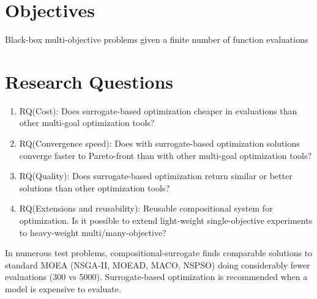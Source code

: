 \section{Objectives}
    Black-box multi-objective problems given a finite number of function evaluations

\section{Research Questions}
\begin{enumerate}
    \item RQ(Cost): Does surrogate-based optimization cheaper in evaluations than other multi-goal optimization tools?
    \item RQ(Convergence speed): Does with surrogate-based optimization solutions converge faster to Pareto-front than with other multi-goal optimization tools?
    \item RQ(Quality): Does surrogate-based optimization return similar or better solutions than other optimization tools?
    \item RQ(Extensions and reusability): Reusable compositional system for optimization. Is it possible to extend light-weight single-objective experiments to heavy-weight multi/many-objective?
\end{enumerate}

In numerous test problems, compositional-surrogate finds comparable solutions to standard MOEA (NSGA-II, MOEAD, MACO, NSPSO) doing considerably fewer evaluations (300 vs 5000). 
Surrogate-based optimization is recommended when a model is expensive to evaluate.



